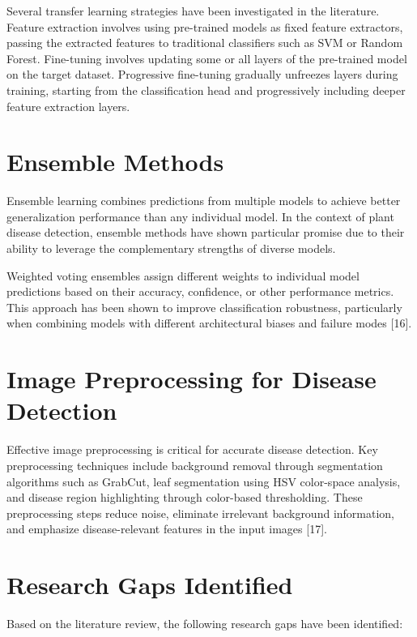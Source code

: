 \documentclass[12pt]{report}
\begin{document}
Several transfer learning strategies have been investigated in the literature. Feature extraction involves using pre-trained models as fixed feature extractors, passing the extracted features to traditional classifiers such as SVM or Random Forest. Fine-tuning involves updating some or all layers of the pre-trained model on the target dataset. Progressive fine-tuning gradually unfreezes layers during training, starting from the classification head and progressively including deeper feature extraction layers.

\section{Ensemble Methods}

Ensemble learning combines predictions from multiple models to achieve better generalization performance than any individual model. In the context of plant disease detection, ensemble methods have shown particular promise due to their ability to leverage the complementary strengths of diverse models.

Weighted voting ensembles assign different weights to individual model predictions based on their accuracy, confidence, or other performance metrics. This approach has been shown to improve classification robustness, particularly when combining models with different architectural biases and failure modes [16].

\section{Image Preprocessing for Disease Detection}

Effective image preprocessing is critical for accurate disease detection. Key preprocessing techniques include background removal through segmentation algorithms such as GrabCut, leaf segmentation using HSV color-space analysis, and disease region highlighting through color-based thresholding. These preprocessing steps reduce noise, eliminate irrelevant background information, and emphasize disease-relevant features in the input images [17].

\section{Research Gaps Identified}

Based on the literature review, the following research gaps have been identified:
\end{document}
